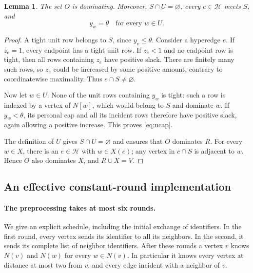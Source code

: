 \documentclass[11pt,a4paper]{article}
\newtheorem{lemma}[lemma]{Lemma}
\theoremstyle{definition}
\theoremstyle{remark}
\newcommand{\HH}{\mathcal H}
\begin{document}
\begin{lemma}\label{lem:output-basic}
The set \(O\) is dominating. Moreover, \(S\cap U=\varnothing\),
every \(e\in\HH\) meets \(S\), and
\begin{equation}\label{eq:ucap}
  y_w=\theta\quad\text{for every }w\in U.
\end{equation}
\end{lemma}
\begin{proof}
A tight unit row belongs to \(S\), since \(y_v\leq\theta\).
Consider a hyperedge \(e\). If \(z_e=1\), every endpoint has a tight
unit row. If \(z_e<1\) and no endpoint row is tight, then all rows
containing \(z_e\) have positive slack. There are finitely many such
rows, so \(z_e\) could be increased by some positive amount, contrary
to coordinatewise maximality. Thus \(e\cap S\ne\varnothing\).

Now let \(w\in U\). None of the unit rows containing \(y_w\) is tight:
such a row is indexed by a vertex of \(N[w]\), which would belong to
\(S\) and dominate \(w\). If \(y_w<\theta\), its personal cap and all
its incident rows therefore have positive slack, again allowing a
positive increase. This proves \eqref{eq:ucap}.

The definition of \(U\) gives \(S\cap U=\varnothing\) and ensures that
\(O\) dominates \(R\). For every \(w\in X\), there is an
\(e\in\HH\) with \(w\in X(e)\); any vertex in \(e\cap S\) is adjacent
to \(w\). Hence \(O\) also dominates \(X\), and \(R\cup X=V\).
\end{proof}

\subsection{An effective constant-round implementation}
\label{sec:implementation}

\paragraph{The preprocessing takes at most six rounds.}
We give an explicit schedule, including the initial exchange of identifiers.
In the first round, every vertex sends its identifier to all its neighbors.
In the second, it sends its complete list of neighbor identifiers.
After these rounds a vertex $v$ knows $N(v)$ and $N(w)$ for every
$w\in N(v)$.  In particular it knows every vertex at distance at most
two from $v$, and every edge incident with a neighbor of $v$.
\end{document}
